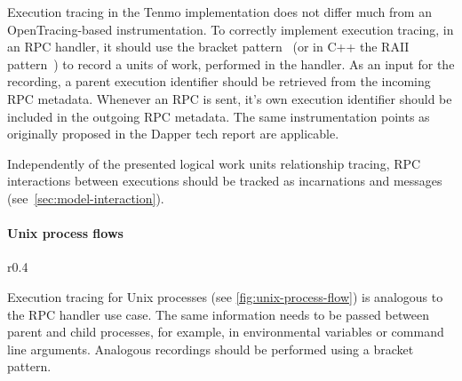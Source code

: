 Execution tracing in the Tenmo implementation does not differ much from an OpenTracing-based instrumentation. To correctly implement execution tracing, in an RPC handler, it should use the bracket pattern~\cite{BracketPattern2019Apr} (or in C++ the RAII pattern~\cite{RAII2020May}) to record a units of work, performed in the handler. As an input for the recording, a parent execution identifier should be retrieved from the incoming RPC metadata. Whenever an RPC is sent, it’s own execution identifier should be included in the outgoing RPC metadata. The same instrumentation points as originally proposed in the Dapper tech report are applicable.

Independently of the presented logical work units relationship tracing, RPC interactions between executions should be tracked as incarnations and messages (see~\cref{sec:model-interaction}).


\paragraph{Unix process flows}

\begin{wrapfigure}{r}{0.4\textwidth}
\caption{Tracing of \texttt{cat fileA > fileB}}
\label{fig:unix-process-flow}
\end{wrapfigure}

Execution tracing for Unix processes (see \cref{fig:unix-process-flow}) is analogous to the RPC handler use case. The same information needs to be passed between parent and child processes, for example, in environmental variables or command line arguments. Analogous recordings should be performed using a bracket pattern.

